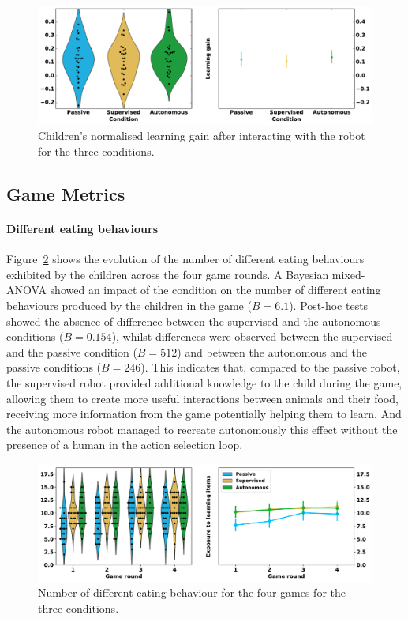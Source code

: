 \begin{figure}[ht]
	\includegraphics[width=1\linewidth]{learning.pdf}
	\centering
	\caption{Children's normalised learning gain after interacting with the robot for the three conditions.}
	\label{fig:tutoring_learning}
\end{figure}

\subsection{Game Metrics}

\paragraph{Different eating behaviours}
Figure~\ref{fig:tutoring_d_eat} shows the evolution of the number of different eating behaviours exhibited by the children across the four game rounds. A Bayesian mixed-ANOVA showed an impact of the condition on the number of different eating behaviours produced by the children in the game ($B=6.1$). Post-hoc tests showed the absence of difference between the supervised and the autonomous conditions ($B=0.154$), whilst differences were observed between the supervised and the passive condition ($B=512$) and between the autonomous and the passive conditions ($B=246$). This indicates that, compared to the passive robot, the supervised robot provided additional knowledge to the child during the game, allowing them to create more useful interactions between animals and their food, receiving more information from the game potentially helping them to learn. And the autonomous robot managed to recreate autonomously this effect without the presence of a human in the action selection loop.

\begin{figure}[ht]
	\includegraphics[width=1\linewidth]{d_eat.pdf}
	\centering
	\caption{Number of different eating behaviour for the four games for the three conditions.}
	\label{fig:tutoring_d_eat}
\end{figure}


